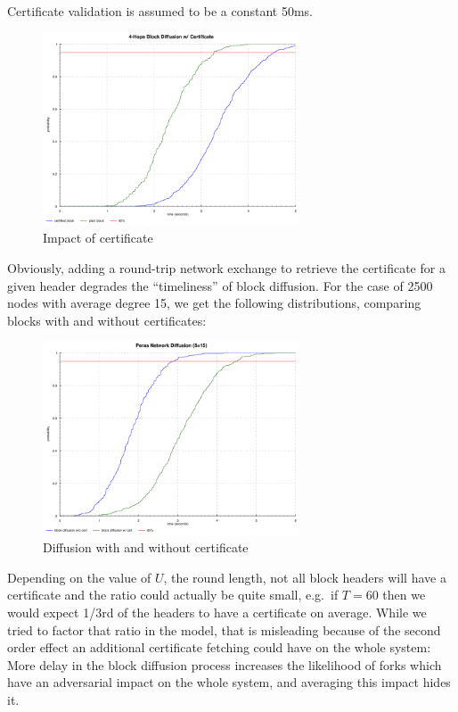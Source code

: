\documentclass[10pt]{article}
\begin{document}
Certificate validation is assumed to be a constant 50ms.

\begin{figure}
\centering
\includegraphics[width=0.68\textwidth]{../diagrams/block-with-cert.png}
\caption{Impact of certificate}
\end{figure}

Obviously, adding a round-trip network exchange to retrieve the
certificate for a given header degrades the ``timeliness'' of block
diffusion. For the case of 2500 nodes with average degree 15, we get the
following distributions, comparing blocks with and without certificates:

\begin{figure}
\centering
\includegraphics[width=0.68\textwidth]{../diagrams/network-with-cert.png}
\caption{Diffusion with and without certificate}
\end{figure}

\begin{quoting}
 Depending on the value of \(U\), the round length, not all
block headers will have a certificate and the ratio could actually be
quite small, e.g.~if \(T=60\) then we would expect 1/3rd of the headers
to have a certificate on average. While we tried to factor that ratio in
the model, that is misleading because of the second order effect an
additional certificate fetching could have on the whole system: More
delay in the block diffusion process increases the likelihood of forks
which have an adversarial impact on the whole system, and averaging this
impact hides it.
\end{quoting}
\end{document}

